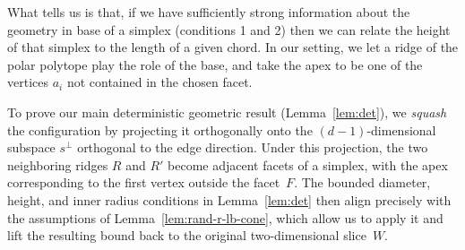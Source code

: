 \documentclass{theoretics}
\begin{document}
What  tells us is that, if we have sufficiently strong information about the geometry in base of a simplex (conditions 1 and 2)
then we can relate the height of that simplex to the length of a given chord. In our setting, we let a ridge of the polar polytope play the role of the base, and take the apex to be one of the vertices $a_i$ not contained in the chosen facet.

To prove our main deterministic geometric result (Lemma~\ref{lem:det}), we \emph{squash} the configuration by projecting it orthogonally onto the $(d-1)$-dimensional subspace $s^\perp$ orthogonal to the edge direction. Under this projection, the two neighboring ridges $R$ and $R'$ become adjacent facets of a simplex, with the apex corresponding to the first vertex outside the facet~$F$. The bounded diameter, height, and inner radius conditions in Lemma~\ref{lem:det} then align precisely with the assumptions of Lemma~\ref{lem:rand-r-lb-cone}, which allow us to apply it and lift the resulting bound back to the original two-dimensional slice~$W$.
\end{document}
